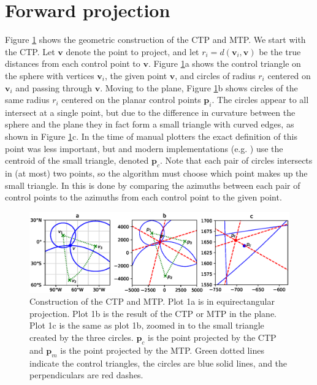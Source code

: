 \documentclass[]{interact}
\begin{document}
\section{Forward projection}
Figure \ref{fig:chamberlin} shows the geometric construction of the CTP and
MTP. We start with the CTP. Let $\mathbf v$ denote the point to project, and
let $r_i = d(\mathbf v_i, \mathbf v)$ be the true distances from each control
point to $\mathbf v$. Figure \ref{fig:chamberlin}a shows the control triangle
on the sphere with vertices $\mathbf v_i$, the given point $\mathbf v$, and
circles of radius $r_i$ centered on $\mathbf v_i$ and passing through
$\mathbf v$. Moving to the plane, Figure \ref{fig:chamberlin}b shows circles of
the same radius $r_i$ centered on the planar control points $\mathbf p_i$. The
circles appear to all intersect at a single point, but due to the difference in
curvature between the sphere and the plane they in fact form a small triangle
with curved edges, as shown in Figure \ref{fig:chamberlin}c. In the time of
manual plotters the exact definition of this point was less important, but
\citet{christensen} and modern implementations (e.g. \citealp{proj}) use the
centroid of the small triangle, denoted $\mathbf p_c$.
Note that each pair of circles intersects in (at most) two points,
so the algorithm must choose which point makes up the small triangle.
In \citet{christensen} this is done by comparing the azimuths between each pair
of control points to the azimuths from each control point to the given point.

\begin{figure}
  \includegraphics[width=\textwidth]{construction}
  \caption{Construction of the CTP and MTP. Plot 1a is in equirectangular
  projection. Plot 1b is the result of the CTP or MTP in the plane. Plot 1c is
  the same as plot 1b, zoomed in to the small triangle created by the three
  circles. $\mathbf p_c$ is the point projected by the CTP and $\mathbf p_m$ is
  the point projected by the MTP. Green dotted lines indicate the control
  triangles, the circles are blue solid lines,
  and the perpendiculars are red dashes.}
  \label{fig:chamberlin}
\end{figure}
\end{document}
